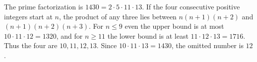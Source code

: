 The prime factorization is $1430=2\cdot5\cdot11\cdot13$. If the four consecutive positive integers start at $n$, the product of any three lies between $n(n+1)(n+2)$ and $(n+1)(n+2)(n+3)$. For $n\le9$ even the upper bound is at most $10\cdot11\cdot12=1320$, and for $n\ge11$ the lower bound is at least $11\cdot12\cdot13=1716$. Thus the four are $10,11,12,13$. Since $10\cdot11\cdot13=1430$, the omitted number is $\boxed{12}$.
